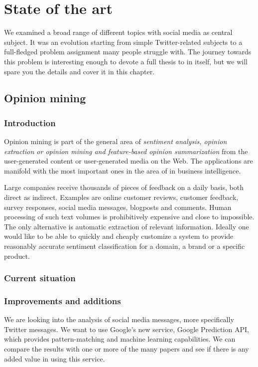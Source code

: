 \chapter{State of the art}

We examined a broad range of different topics with social media as central subject. It was an evolution starting from simple Twitter-related subjects to a full-fledged problem assignment many people struggle with. The journey towards this problem is interesting enough to devote a full thesis to in itself, but we will spare you the details and cover it in this chapter.

\section{Opinion mining}

\subsection{Introduction}
\label{general - opinion mining}
Opinion mining is part of the general area of \textit{sentiment analysis, opinion extraction or opinion mining and feature-based opinion summarization} from the user-generated content or user-generated media on the Web. The applications are manifold with the most important ones in the area of in business intelligence. 

Large companies receive thousands of pieces of feedback on a daily basis, both direct as indirect. Examples are online customer reviews, customer feedback, survey responses, social media messages, blogposts and comments. Human processing of such text volumes is prohibitively expensive and close to impossible. The only alternative is automatic extraction of relevant information. Ideally one would like to be able to quickly and cheaply customize a system to provide reasonably accurate sentiment classification for a domain, a brand or a specific product.

\subsection{Current situation}


\subsection{Improvements and additions}
We are looking into the analysis of social media messages, more specifically Twitter messages. We want to use Google's new service, Google Prediction API, which provides pattern-matching and machine learning capabilities. We can compare the results with one or more of the many papers and see if there is any added value in using this service.

